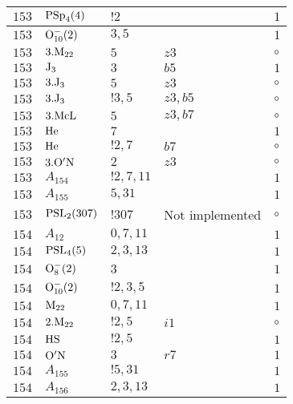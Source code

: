 \documentclass[a4paper, 11pt]{article}
\begin{document}
\begin{longtable}{lllll}
        $ 153 $ & $ {\rm PSp}_{4}(4) $ & $ ! 2 $ & $ ~ $ & $ 1$ \\ \hline
        $ 153 $ & $ {\rm O}_{10}^-(2) $ & $ 3, 5 $ & $ ~ $ & $ 1$ \\ \hline
        $ 153 $ & $ 3.{\rm M}_{22} $ & $ 5 $ & $ z3 $ &  $\circ$ \\ \hline
        $ 153 $ & $ {\rm J}_3 $ & $ 3 $ & $ b5 $ & $ 1$ \\ \hline
        $ 153 $ & $ 3.{\rm J}_3 $ & $ 5 $ & $ z3 $ &  $\circ$ \\ \hline
        $ 153 $ & $ 3.{\rm J}_3 $ & $ ! 3,5 $ & $ z3, b5 $ &  $\circ$ \\ \hline
        $ 153 $ & $ 3.{\rm McL} $ & $ 5 $ & $ z3, b7 $ &  $\circ$ \\ \hline
        $ 153 $ & $ {\rm He} $ & $ 7 $ & $ ~ $ & $ 1$ \\ \hline
        $ 153 $ & $ {\rm He} $ & $ ! 2,7 $ & $ b7 $ &  $\circ$ \\ \hline
        $ 153 $ & $ 3.{\rm {\rm O'N}} $ & $ 2 $ & $ z3 $ &  $\circ$ \\ \hline
        $ 153 $ & $ A_{154} $ & $ !2, 7, 11 $ & $ ~ $ & $ 1$ \\ \hline
        $ 153 $ & $ A_{155} $ & $ 5, 31 $ & $ ~ $ & $ 1$ \\ \hline
        $ 153 $ & $ {\rm PSL}_{2}(307) $ & $ !307 $ &  Not implemented &  $\circ$ \\ \hline
        $ 154 $ & $ A_{12} $ & $ 0,7,11 $ & $ ~ $ & $ 1$ \\ \hline
        $ 154 $ & $ {\rm PSL}_{4}(5) $ & $ 2, 3, 13 $ & $ ~ $ & $ 1$ \\ \hline
        $ 154 $ & $ {\rm O}_{8}^-(2) $ & $ 3 $ & $ ~ $ & $ 1$ \\ \hline
        $ 154 $ & $ {\rm O}_{10}^-(2) $ & $ ! 2,3,5 $ & $ ~ $ & $ 1$ \\ \hline
        $ 154 $ & $ {\rm M}_{22} $ & $ 0,7,11 $ & $ ~ $ & $ 1$ \\ \hline
        $ 154 $ & $ 2.{\rm M}_{22} $ & $ ! 2,5 $ & $ i1 $ &  $\circ$ \\ \hline
        $ 154 $ & $ {\rm HS} $ & $ ! 2,5 $ & $ ~ $ & $ 1$ \\ \hline
        $ 154 $ & $ {\rm O'N} $ & $ 3 $ & $ r7 $ & $ 1$ \\ \hline
        $ 154 $ & $ A_{155} $ & $ !5, 31 $ & $ ~ $ & $ 1$ \\ \hline
        $ 154 $ & $ A_{156} $ & $ 2, 3, 13 $ & $ ~ $ & $ 1$ \\ \hline

\end{longtable}
\end{document}
